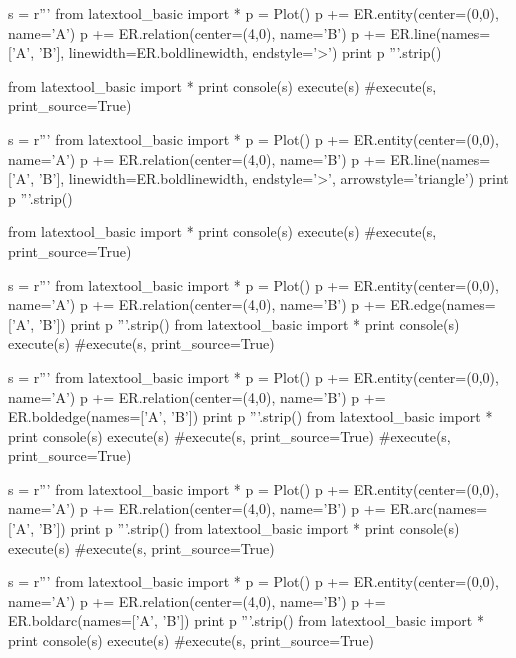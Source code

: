 \begin{python}
s = r'''
from latextool_basic import *
p = Plot()
p += ER.entity(center=(0,0), name='A')
p += ER.relation(center=(4,0), name='B')
p += ER.line(names=['A', 'B'],
             linewidth=ER.boldlinewidth, endstyle='>')
print p
'''.strip()

from latextool_basic import *
print console(s)
execute(s)
#execute(s, print_source=True)
\end{python}

\begin{python}
s = r'''
from latextool_basic import *
p = Plot()
p += ER.entity(center=(0,0), name='A')
p += ER.relation(center=(4,0), name='B')
p += ER.line(names=['A', 'B'],
             linewidth=ER.boldlinewidth, endstyle='>',
             arrowstyle='triangle')
print p
'''.strip()

from latextool_basic import *
print console(s)
execute(s)
#execute(s, print_source=True)
\end{python}

\begin{python}
s = r'''
from latextool_basic import *
p = Plot()
p += ER.entity(center=(0,0), name='A')
p += ER.relation(center=(4,0), name='B')
p += ER.edge(names=['A', 'B'])
print p
'''.strip()
from latextool_basic import *
print console(s)
execute(s)
#execute(s, print_source=True)
\end{python}

\begin{python}
s = r'''
from latextool_basic import *
p = Plot()
p += ER.entity(center=(0,0), name='A')
p += ER.relation(center=(4,0), name='B')
p += ER.boldedge(names=['A', 'B'])
print p
'''.strip()
from latextool_basic import *
print console(s)
execute(s)
#execute(s, print_source=True)
#execute(s, print_source=True)
\end{python}

\begin{python}
s = r'''
from latextool_basic import *
p = Plot()
p += ER.entity(center=(0,0), name='A')
p += ER.relation(center=(4,0), name='B')
p += ER.arc(names=['A', 'B'])
print p
'''.strip()
from latextool_basic import *
print console(s)
execute(s)
#execute(s, print_source=True)
\end{python}

\begin{python}
s = r'''
from latextool_basic import *
p = Plot()
p += ER.entity(center=(0,0), name='A')
p += ER.relation(center=(4,0), name='B')
p += ER.boldarc(names=['A', 'B'])
print p
'''.strip()
from latextool_basic import *
print console(s)
execute(s)
#execute(s, print_source=True)
\end{python}


